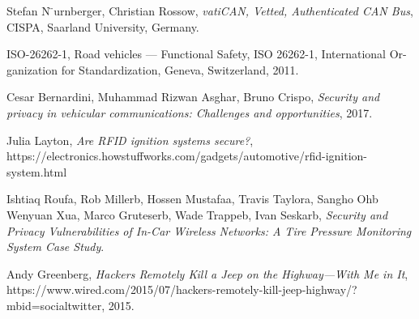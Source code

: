 \documentclass[11pt]{article}
\begin{document}
\begin{thebibliography}{10}
    Stefan N ̈urnberger, Christian Rossow,
    \textit{vatiCAN, Vetted, Authenticated CAN Bus},
	CISPA, Saarland University, Germany.
	
	ISO-26262-1, Road vehicles — Functional Safety, ISO 26262-1, International Or- ganization for Standardization, Geneva, Switzerland, 2011.
	
	Cesar Bernardini, Muhammad Rizwan Asghar, Bruno Crispo,
	\textit{Security and privacy in vehicular communications: Challenges and opportunities}, 2017.
	
	Julia Layton, \textit{Are RFID ignition systems secure?}, https://electronics.howstuffworks.com/gadgets/automotive/rfid-ignition-system.html
	
	Ishtiaq Roufa, Rob Millerb, Hossen Mustafaa, Travis Taylora, Sangho Ohb
	Wenyuan Xua, Marco Gruteserb, Wade Trappeb, Ivan Seskarb, \textit{Security and Privacy Vulnerabilities of In-Car Wireless Networks: A Tire Pressure Monitoring System Case Study}.
	
	Andy Greenberg, \textit{Hackers Remotely Kill a Jeep on the Highway—With Me in It}, https://www.wired.com/2015/07/hackers-remotely-kill-jeep-highway/?mbid=social\textunderscore twitter, 2015.

	
\end{thebibliography}
\end{document}
